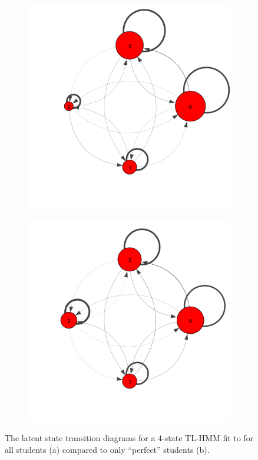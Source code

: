 \begin{figure}
  \centering
  \begin{subfigure}[t]{0.5\textwidth}
    \includegraphics[width=\textwidth,trim={0 3cm 0 2cm}]{figures/trans-comp/trans-avg.png}
    \caption{\label{fig:trans-avg}}
  \end{subfigure}%
  \begin{subfigure}[t]{0.5\textwidth}
    \includegraphics[width=\textwidth,trim={0, 3cm 0 2cm}]{figures/trans-comp/trans-perfect.png}
    \caption{\label{fig:trans-perfect}}
  \end{subfigure}
  \caption{The latent state transition diagrams for a 4-state TL-HMM fit to
  \protect\textretrieval{} for all students (a) compared to only ``perfect''
  students (b).}
  \label{fig:trans-comp}
\end{figure}

